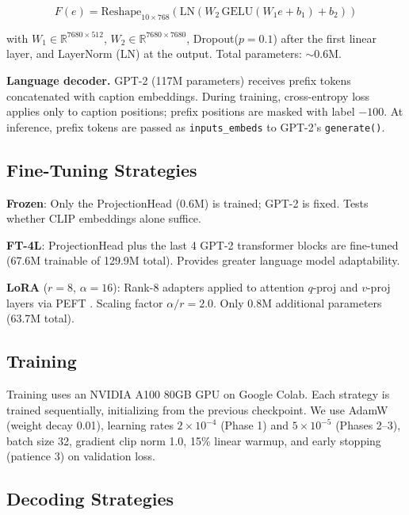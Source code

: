 \documentclass[conference]{IEEEtran}
\begin{document}
\begin{equation}
F(e) = \text{Reshape}_{10 \times 768}\!\left(\text{LN}\!\left(W_2\,\text{GELU}(W_1 e + b_1) + b_2\right)\right)
\end{equation}

with $W_1 \in \mathbb{R}^{7680 \times 512}$, $W_2 \in \mathbb{R}^{7680 \times 7680}$, Dropout($p=0.1$) after the first linear layer, and LayerNorm (LN) at the output. Total parameters: $\sim$0.6M.

\textbf{Language decoder.} GPT-2 \cite{radford2019language} (117M parameters) receives prefix tokens concatenated with caption embeddings. During training, cross-entropy loss applies only to caption positions; prefix positions are masked with label $-100$. At inference, prefix tokens are passed as \texttt{inputs\_embeds} to GPT-2's \texttt{generate()}.

\subsection{Fine-Tuning Strategies}

\textbf{Frozen}: Only the ProjectionHead (0.6M) is trained; GPT-2 is fixed. Tests whether CLIP embeddings alone suffice.

\textbf{FT-4L}: ProjectionHead plus the last 4 GPT-2 transformer blocks are fine-tuned (67.6M trainable of 129.9M total). Provides greater language model adaptability.

\textbf{LoRA} ($r=8$, $\alpha=16$): Rank-8 adapters applied to attention $q$-proj and $v$-proj layers via PEFT \cite{hu2022lora}. Scaling factor $\alpha/r = 2.0$. Only 0.8M additional parameters (63.7M total).

\subsection{Training}

Training uses an NVIDIA A100 80GB GPU on Google Colab. Each strategy is trained sequentially, initializing from the previous checkpoint. We use AdamW \cite{loshchilov2017decoupled} (weight decay 0.01), learning rates $2\times10^{-4}$ (Phase 1) and $5\times10^{-5}$ (Phases 2--3), batch size 32, gradient clip norm 1.0, 15\% linear warmup, and early stopping (patience 3) on validation loss.

\subsection{Decoding Strategies}
\end{document}
